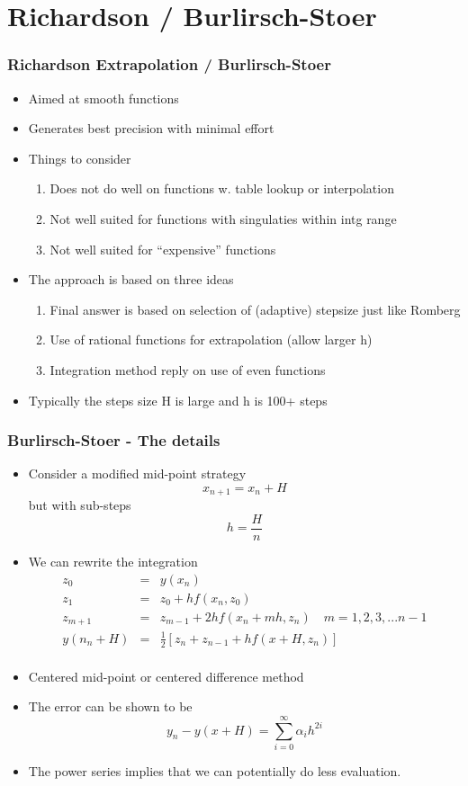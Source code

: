 \documentclass[10pt]{beamer}
\begin{document}
\section{Richardson / Burlirsch-Stoer}

\begin{frame}
  \frametitle{Richardson Extrapolation / Burlirsch-Stoer}
  \begin{itemize}
  \item Aimed at smooth functions 
  \item Generates best precision with minimal effort
  \item Things to consider
    \begin{enumerate}
    \item Does not do well on functions w. table lookup or interpolation
    \item Not well suited for functions with singulaties within intg range
    \item Not well suited for ``expensive'' functions
    \end{enumerate}
  \item The approach is based on three ideas
    \begin{enumerate}
    \item Final answer is based on selection of (adaptive) stepsize just like Romberg
    \item Use of rational functions for extrapolation (allow larger h)
    \item Integration method reply on use of even functions
    \end{enumerate}
  \item Typically the steps size H is large and h is 100+ steps
  \end{itemize}
\end{frame}

\begin{frame}
  \frametitle{Burlirsch-Stoer - The details}
  \begin{itemize}
  \item Consider a modified mid-point strategy
    \[
      x_{n+1} = x_n + H
    \] but with sub-steps
    \[
      h = \frac{H}{n}
    \]
  \item We can rewrite the integration
    \[
      \begin{array}{rcl}
        z_0 & = & y(x_n)\\
        z_1 & = & z_0 + h f( x_n, z_0 )\\
        z_{m+1} & = & z_{m-1} + 2h f(x_{n} + mh, z_n) \mbox{~~~} m = 1, 2, 3, ...{n-1}\\
        y(n_n + H) & = & \frac{1}{2} [ z_n + z_{n-1} + h f(x+H, z_n) ] \\ 
      \end{array}
    \]
  \item Centered mid-point or centered difference method
  \item The error can be shown to be
    \[
      y_n - y(x+H) = \sum_{i=0}^{\infty} \alpha_i h^{2i}
    \]
  \item The power series implies that we can potentially do less evaluation. 
  \end{itemize}
\end{frame}
\end{document}

